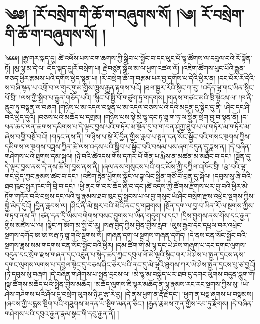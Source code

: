 \setcounter{footnote}{0} 
\chapter{༄༅། །རོ་བསྲེག་གི་ཆོ་ག་བཞུགས་སོ། །༄། རོ་བསྲེག་གི་ཆོ་ག་བཞུགས་སོ། ། }༄༅༅། །རྒྱ་གར་སྐད་དུ། ཚེ་འཕོས་པས་བག་ཆགས་ཀྱི་སྒྲིབ་པ་སྦྱོང་བ་དང་ཕུང་པོ་ལྷ་ཚོགས་ལ་དབུལ་བའི་རོ་སྟོན་ཏོ། །མུ་ལྷ་མ་དེ་ལ། བོད་སྐད་དུ།རོ་བསྲེག་པ། རྗེ་བཙུན་སྒྲོལ་མ་ལ་ཕྱག་འཚལ་ལོ། །འཇིག་ཚོགས་ཕུང་པོའི་རྒྱུན་གཅད་ཕྱིར་རྩམས་པའི་དགོས་ཕྱེད་སྟན་པ། །རོ་བསྲེག་ཆོ་ག་བརྩམ་པར་བྱ་དགོས་པ་དེའི་ཕྱིར་ན། །དང་པོར་རོ་དེའི་ས་བཞི་སྟན་པ་འགྲོ་བ་ལ་གུར་གུམ་གྱིས་ཁྲུས་རྒྱན་རྟགས་པའོ། །ཐལ་སྦྱར་རོའི་སྙིང་ཀ་རུ། །འདོད་ལྷ་གང་ཡིན་སྙིང་པོ་བྲི། །ལས་ཀྱི་སྒྲིབ་པ་རྒྱུན་གཅོད་པའི། །སྙིང་པོ་སྤྱི་བོ་གཙུག་ཏུ་གདགས། །གནས་གཙང་མའི་ཁྲི་སྟེངས་ལ། །ཁ་ནི་ནུབ་ཏུ་བསྟན་ལ་བཞག །གཉིས་པ་མ་འདལ་བསྟན་པ་མ་འདལ་བཅས་པའི་དེའི་མདུན་དུ་སྟེང་དུ་ནི། །ཤིང་དང་ཤི་བའི་ཕྱེད་དུའོ། །བཅས་པའི་མཆོད་པ་དགྲམ། །གཉིས་པས་སྟེ་མེ་ལྷ་དང་ཏ་ཐཱ་ག་ཏ་ལ་སྦྱིན་སྲེག་བྱ་བ་སྟན་ནོ། །ད་ཕན་ཆད་ལན་ཆགས་དམིགས་པ་དེ་ལྟར་བྱས་པའི་གཏོར་མ་སྔོན་དུ་བ་ག་བན་ཤཱཀྱ་ཐུབ་པ་ལ་གཏོར་མ་གཏོར་མ་ཞེས་བགྱི་བསྔོ་བའོ། །གཏང་ནས་ནི། །གཉིས་པ་སྟེ་རོ་བྱིན་གྱིས་རླབ་པ་སྟན་ངན་སོང་སྦྱོང་བའི་གསང་སྔགས་ཀྱིས་དམིགས་ལ་སྔགས་བཟླས་ཀྱིན་ཚེ་ལས་འདས་པའི་སྒྲིབ་པ་སྦྱོང་བའི་བསམ་པས་ཞག་བདུན་དུ་ཟླས་ན། །དེ་བཞིན་གཤེགས་པའི་ཐུགས་དམ་སྐུལ། །ཉེ་བའི་ཚེའདས་གོས་དཀར་པོ་གོན་པ་རྨིས་ན་མཚན་མ་མཐོང་བ་དང་། །སྔོན་དུ་དེ་ལྟར་བྱས་ནས་དེ་ནས་ཆོ་ག་བྱས་ནས་ནི། །ཞལ་ནས་གསུངས་པའི་གང་མོས་ཀྱི་དཀྱིལ་འཁོར་བྲི། །རྩ་བའི་ལྷ་གང་བྱེད་ཀྱང་རྣམས་ཚང་བ་དང་། །འཇིག་རྟེན་ཕྱོགས་སྐྱོང་ལ་བྷ་ལིང་སྦྱིན་གཙོ་བོ་བྲན་དུ་སྐོལ། །དབུས་སུ་ཞི་བའི་ཐབ་ཁུང་སྤུར་ཁང་གི་བྲི་བ་དང་། །ཕྱི་ནང་གི་བར་ཆོད་ཞི་བ་དང་།ཚེ་འདས་ཀྱི་ཚོགས་རྫོགས་པར་བྱ་བའི་ཕྱིར་མེ་ཏོག་གཏོར་བའི་བསྲས་དང་ལའི་ལྷ་རྣམས་ཐབ་ཁུང་དུ་སྦྱངས་པ་ལ་བྱ་གསུང་ཡཾ་ཤིང་བསྲེག་རྫས་འཕྲེང་སྔགས་ཀྱིས་སྐྱེ་མེད་དུའོ། །བྱིན་རླབས་ལ། །ཤིང་ནི་མེ་སྦར་བའི་མེའི་ནང་དུ་གཟུགས། །སྔོན་དག་ལ་བྱ་བ་ཡིན་རོ་ལ་སྔགས་ཀྱིས་གཏབ་ནས་ནི། །ཙན་དན་དྲི་ཡིས་བགེགས་བསང་བྱུགས་པ་ཡིན་གདུག་པ་དང་། །དྲིས་བྱུགས་ནས་གོས་དང་རྒྱན་གྱིས་མཛེས་པ་ལ། །སྙིང་ཀ་ཨོག་མ་སྤྱི་བོ་རུ། །སརྦ་བྱིད་ཀྱིས་བྱིན་གྱིས་རླབ། །ལུས་རྒྱབ་དང་དཔྲལ་བར་འཕྲེང་སྔགས་དགོད་ཨ་ཨ་སརྦ་ཏ་ཐཱ་གའི་སྔགས་སོ། །གཞན་དག་ལ་སྔགས་གཞན་དགོད། །དེ་ནས་ངན་སོང་སྦྱོང་བའི་སྔགས་ཟླས་སམ་གདགས་ངན་སོང་སྦྱོང་བའི་ཕྱིར། །དམ་ཚིག་གི་མེ་ལྷ་དང་ཡེ་ཤེས་གཞུག་པ་དང་དགང་ལུགས་བདུན་དང་སྲེག་རྫས་གཞན་དང་འཐུན་པ་སྙེད་ཚད་ཀྱང་དབུལ་ལོ་མེ་ལྷའི་སྙིང་གར་ཡེ་ཤེས་པ་སྤྱན་དྲངས་ནས་དགང་ལུགས་ལགས་པ་དབུལ་སྟེང་དུ་བཅས་ཤིང་ཅེར་པའི་ནང་དུ་མེ་ལྷའི་ཐུགས་ཀར་ཡེ་ཤེས་སྤྱན་དྲངས་པུ་ཙ་བྱའོ། །ཏེ་དབུས་སུ་བཞག །དེ་བཞིན་གཤེགས་པ་སྤྱན་དྲངས་ལ། །མེ་ལྷ་མ་བསྐྱེད་པར་ཐབ་དུ་དགང་ལུགས་བདུན་བླུག་གོ། །སྣ་ཚོགས་མཆོད་པའི་སྤྲིན་གྱིས་མཆོད། །མཆོད་ལུགས་ཇི་ལྟར་མཆོད་ན་ལྷ་རྣམས་རང་རང་སྔགས་ཀྱིས་སུ། །ཡེ་ཤེས་གཤེགས་པའི་ཤོལ་དུ་བསྲེག་ལུགས་ཉི་ཤུ་རྩ་རེ་བྱ། །དེ་ནས་ཕྱག་ན་རྡོ་རྗེ་དང་། །ཕྱག་ན་པདྨ་ཞགས་པ་བསྣམས། །ཞབས་ཀྱི་པདྨས་སྡིག་པའི་གཟུགས་མནན་པ་སྡིག་མནན་ཅིང་། །རྒྱན་རྣམས་ཀུན་གྱིས་རབ་ཏུ་རྫོགས། །དེ་བཞིན་གཤེགས་པའི་དབུའ་རྒྱན་རྣམ་སྣང་གི་དབུ་རྒྱན་ནོ། །

